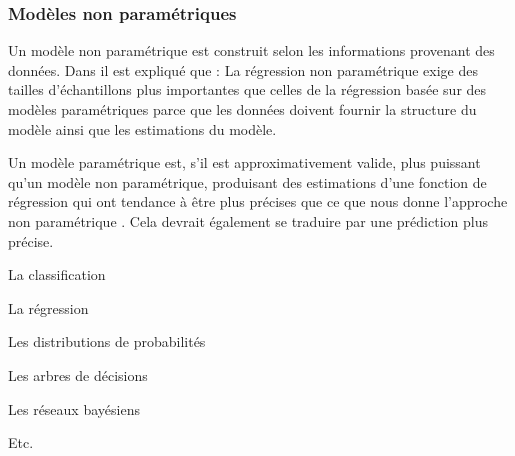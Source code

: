 	\subsubsection{\textbf{Modèles non paramétriques}} \label{subsec:modelisation-param}
	
	
	
	
	Un {modèle non paramétrique} est construit selon les informations provenant des données. Dans \cite{bishop2006pattern, antoine2018apprentissage} il est expliqué que : La régression non paramétrique exige des tailles d'échantillons plus importantes que celles de la régression basée sur des modèles paramétriques parce que les données doivent fournir la structure du modèle ainsi que les estimations du modèle.
	
	Un {modèle paramétrique} est, s'il est approximativement valide, plus puissant qu'un modèle non paramétrique, produisant des estimations d'une fonction de régression qui ont tendance à être plus précises que ce que nous donne l'approche non paramétrique \cite{matloff2017statistical}. Cela devrait également se traduire par une prédiction plus précise. 
	
	
	\begin{list}{--}{Dans \cite{antoine2018apprentissage}, il est expliqué que nous pouvons construire un modèle d'apprentissage, ou l'espaces des hypothèses d'apprentissage, par: }
		\item La classification
		\item La régression
		\item Les distributions de probabilités
		\item Les arbres de décisions
		\item Les réseaux bayésiens 
		\item Etc.
	\end{list}	
	
